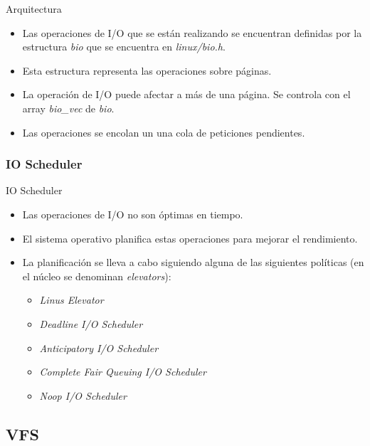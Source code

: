 \begin{frame}{Arquitectura}
	\begin{itemize}
		\item Las operaciones de I/O que se están realizando se encuentran definidas por la estructura \emph{bio} que se encuentra en \emph{linux/bio.h}.
		\item Esta estructura representa las operaciones sobre páginas.
		\item La operación de I/O puede afectar a más de una página. Se controla con el array \emph{bio\_vec} de \emph{bio}.
		\item Las operaciones se encolan un una cola de peticiones pendientes.
	\end{itemize}
\end{frame}

\subsubsection{IO Scheduler}
\begin{frame}{IO Scheduler}
	\begin{itemize}
		\item Las operaciones de I/O no son óptimas en tiempo.
		\item El sistema operativo planifica estas operaciones para mejorar el rendimiento.
		\item La planificación se lleva a cabo siguiendo alguna de las siguientes políticas (en el núcleo se denominan \emph{elevators}):
		\begin{itemize}
			\item \emph{Linus Elevator}
			\item \emph{Deadline I/O Scheduler}
			\item \emph{Anticipatory I/O Scheduler}
			\item \emph{Complete Fair Queuing I/O Scheduler}
			\item \emph{Noop I/O Scheduler}
		\end{itemize}
	\end{itemize}
\end{frame}

\subsection{VFS}
